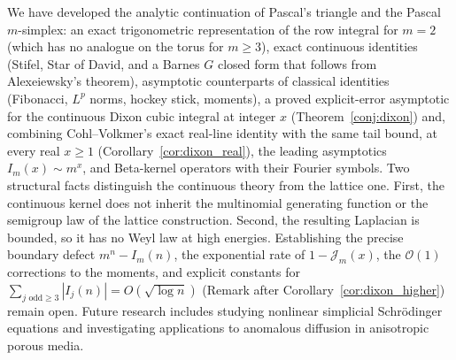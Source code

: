 \documentclass[11pt,a4paper]{article}
\theoremstyle{plain}
\theoremstyle{definition}
\theoremstyle{remark}
\numberwithin{equation}{section}
\begin{document}
We have developed the analytic continuation of Pascal's triangle and the Pascal $m$-simplex: an exact trigonometric representation of the row integral for $m = 2$ (which has no analogue on the torus for $m \ge 3$), exact continuous identities (Stifel, Star of David, and a Barnes $G$ closed form that follows from Alexeiewsky's theorem), asymptotic counterparts of classical identities (Fibonacci, $L^p$ norms, hockey stick, moments), a proved explicit-error asymptotic for the continuous Dixon cubic integral at integer $x$ (Theorem~\ref{conj:dixon}) and, combining Cohl--Volkmer's exact real-line identity with the same tail bound, at every real $x \ge 1$ (Corollary~\ref{cor:dixon_real}), the leading asymptotics $I_m(x) \sim m^x$, and Beta-kernel operators with their Fourier symbols. Two structural facts distinguish the continuous theory from the lattice one. First, the continuous kernel does not inherit the multinomial generating function or the semigroup law of the lattice construction. Second, the resulting Laplacian is bounded, so it has no Weyl law at high energies. Establishing the precise boundary defect $m^n - I_m(n)$, the exponential rate of $1 - \mathcal{J}_m(x)$, the $\mathcal{O}(1)$ corrections to the moments, and explicit constants for $\sum_{j\text{ odd}\ge3}|I_j(n)| = O(\sqrt{\log n})$ (Remark after Corollary~\ref{cor:dixon_higher}) remain open. Future research includes studying nonlinear simplicial Schrödinger equations and investigating applications to anomalous diffusion in anisotropic porous media.


\end{document}
